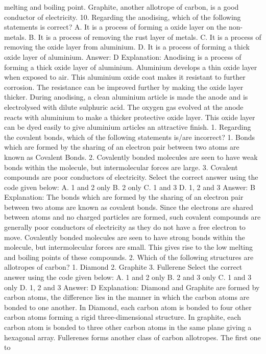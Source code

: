melting and boiling point. Graphite, another allotrope of carbon, is a
good conductor of electricity.
10. Regarding the anodising, which of the following statements is
correct?
A. It is a process of forming a oxide layer on the non-metals.
B. It is a process of removing the rust layer of metals.
C. It is a process of removing the oxide layer from aluminium.
D. It is a process of forming a thick oxide layer of aluminium.
Answer: D
Explanation: Anodising is a process of forming a thick oxide layer of
aluminium. Aluminium develops a thin oxide layer when exposed to
air.
This aluminium oxide coat makes it resistant to further corrosion.
The resistance can be improved further by making the oxide layer
thicker. During anodising, a clean aluminium article is made the anode
and is electrolysed with dilute sulphuric acid.
The oxygen gas evolved at the anode reacts with aluminium to make
a thicker protective oxide layer. This oxide layer can be dyed easily
to give aluminium articles an attractive finish.
1. Regarding the covalent bonds, which of the following
statements is/are incorrect?
1. Bonds which are formed by the sharing of an electron pair
between two atoms are known as Covalent Bonds.
2. Covalently bonded molecules are seen to have weak bonds within
the molecule, but intermolecular forces are large.
3. Covalent compounds are poor conductors of electricity.
Select the correct answer using the code given below:
A. 1 and 2 only
B. 2 only
C. 1 and 3
D. 1, 2 and 3
Answer: B
Explanation:
The bonds which are formed by the sharing of an electron pair
between two atoms are known as covalent bonds. Since the electrons
are shared between atoms and no charged particles are formed,
such covalent compounds are generally poor conductors of
electricity as they do not have a free electron to move.
Covalently bonded molecules are seen to have strong bonds within
the molecule, but intermolecular forces are small. This gives rise to
the low melting and boiling points of these compounds.
2. Which of the following structures are allotropes of carbon?
1. Diamond
2. Graphite
3. Fullerene
Select the correct answer using the code given below:
A. 1 and 2 only
B. 2 and 3 only
C. 1 and 3 only
D. 1, 2 and 3
Answer: D
Explanation: Diamond and Graphite are formed by carbon atoms, the
difference lies in the manner in which the carbon atoms are bonded
to one another. In Diamond, each carbon atom is bonded to four
other carbon atoms forming a rigid three-dimensional structure.
In graphite, each carbon atom is bonded to three other carbon
atoms in the same plane giving a hexagonal array.
Fullerenes forms another class of carbon allotropes. The first one to

